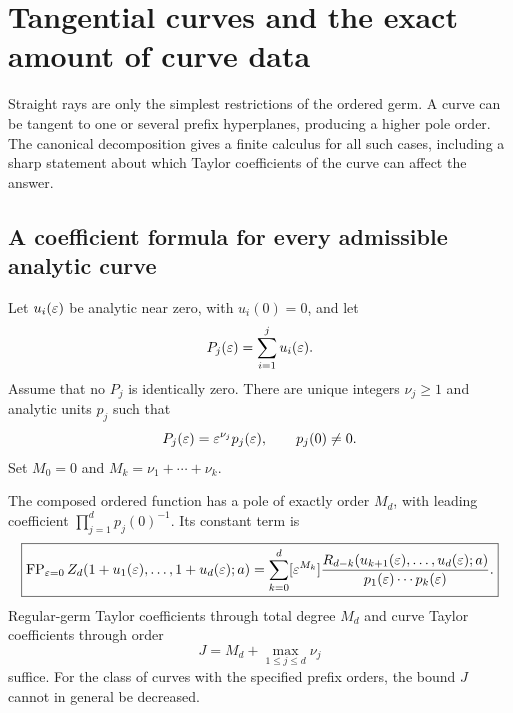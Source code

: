 \section{Tangential curves and the exact amount of curve data}
\label{sec:curves}

Straight rays are only the simplest restrictions of the ordered germ.
A curve can be tangent to one or several prefix hyperplanes, producing
a higher pole order. The canonical decomposition gives a finite
calculus for all such cases, including a sharp statement about which
Taylor coefficients of the curve can affect the answer.

\subsection{A coefficient formula for every admissible analytic curve}

Let $u_i(\varepsilon)$ be analytic near zero, with $u_i(0)=0$, and let
\begin{equation}\label{curve:prefix}
 P_j(\varepsilon)=\sum_{i=1}^j u_i(\varepsilon).
\end{equation}
Assume that no $P_j$ is identically zero. There are unique integers
$\nu_j\ge1$ and analytic units $p_j$ such that
\begin{equation}\label{curve:units}
 P_j(\varepsilon)=\varepsilon^{\nu_j}p_j(\varepsilon),\qquad p_j(0)\ne0.
\end{equation}
Set $M_0=0$ and $M_k=\nu_1+\cdots+\nu_k$.

\begin{theorem}
\label{curve:main}
The composed ordered function has a pole of exactly order $M_d$, with
leading coefficient $\prod_{j=1}^d p_j(0)^{-1}$. Its constant term is
\begin{equation}\label{curve:FP}
 \boxed{\displaystyle
 \operatorname{FP}_{\varepsilon=0}Z_d(1+u_1(\varepsilon),\ldots,1+u_d(\varepsilon);a)
 =\sum_{k=0}^d[\varepsilon^{M_k}]
 \frac{R_{d-k}(u_{k+1}(\varepsilon),\ldots,u_d(\varepsilon);a)}
      {p_1(\varepsilon)\cdots p_k(\varepsilon)}.}
\end{equation}
Regular-germ Taylor coefficients through total degree $M_d$ and curve
Taylor coefficients through order
\begin{equation}\label{curve:order}
 J=M_d+\max_{1\le j\le d}\nu_j
\end{equation}
suffice. For the class of curves with the specified prefix orders,
the bound $J$ cannot in general be decreased.
\end{theorem}

